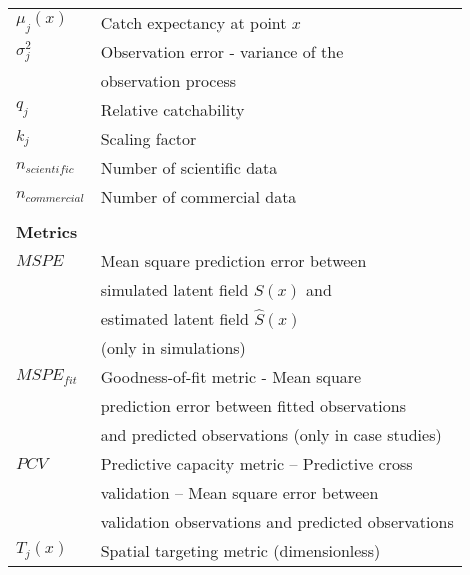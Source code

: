 \begin{center}
\begin{longtable}{ll}
\\
\(\mu_j(x)\)                      & Catch expectancy at point \(x\) 
\\
\(\sigma_j^2\)                    & Observation error - variance of the \\
                                  & observation process                                                                                 \\
\(q_j\)                           & Relative catchability                                                                                                                   \\
\(k_j\)                           & Scaling factor                                                                                                                          \\
\(n_{scientific}\)                & Number of scientific data                                                                                                               \\
\(n_{commercial}\)                & Number of commercial data                                                                                                               \\
                                  &                                                                                                                                         \\
\textbf{Metrics}                  &                                                                                                                                         \\
\(MSPE\)                          & Mean square prediction error between \\
                                  & simulated latent field \(S(x)\) and \\
                                  & estimated latent field \(\hat{S}(x)\) \\
                                  & (only in simulations)                                                                                                                   \\
\(MSPE_{fit}\)                    & Goodness-of-fit metric - Mean square \\
                                  & prediction error between fitted observations \\
                                  & and predicted observations (only in case studies) \\
\(PCV\)                           & Predictive capacity metric – Predictive cross \\
                                  & validation – Mean square error between \\
                                  & validation observations and predicted observations \\
\(T_j(x)\)                        & Spatial targeting metric (dimensionless)                                                                                               


\end{longtable}
\end{center}
